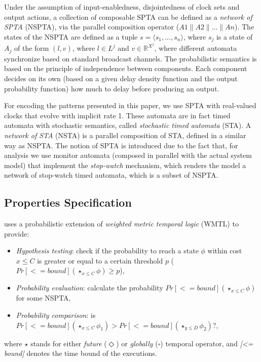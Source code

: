 Under the assumption of input-enabledness, disjointedness of clock sets and output actions, a collection of composable SPTA can be defined as a  \textit{network of SPTA} (NSPTA), via the parallel composition operator ($A1\parallel A2 \parallel ... \parallel An$).
The states of the NSPTA are defined as a tuple $s = \langle s_1,...,s_n\rangle$, where $s_j$ is a state of $A_j$ of the form $(l, v)$, where $l \in L^j$ and $v \in \mathbb{R}^{X^j}$, where different automata synchronize based on standard broadcast channels. 
The probabilistic semantics is based on the principle of independence between components.
Each component decides on its own (based on a given delay density function and the output probability function) how much to delay before producing an output.

For encoding the patterns presented in this paper, we use SPTA with real-valued clocks that evolve with implicit rate 1. These automata are in fact timed automata with stochastic semantics, called \textit{stochastic timed automata} (STA). A \textit{network of STA} (NSTA) is a parallel composition of STA, defined in a similar way as NSPTA. The notion of SPTA is introduced due to the fact that, for analysis we use monitor automata (composed in parallel with the actual system model) that implement the \emph{stop-watch} mechanism, which renders the model a network of stop-watch timed automata, which is a subset of NSPTA.

\subsection*{Properties Specification}
\uppaalsmc{} uses a probabilistic extension of \textit{weighted metric temporal logic} (WMTL) \cite{bulychev2012rewrite} to provide:
\begin{itemize}
	\item \textit{Hypothesis testing}: check if the probability to reach a state $\phi$ within cost $x\leq C$ is greater or equal to a certain threshold $p$ ($Pr[<= bound](\star_{x\leq C}\phi) \geq p$),
	\item \textit{Probability evaluation}: calculate the probability $Pr[<= bound](\star_{x\leq C}\phi)$ for some NSPTA,
	\item \textit{Probability comparison}: is $Pr[<= bound](\star_{x\leq C}\phi_1) > Pr[<= bound](\star_{y\leq D}\phi_2)$?,
\end{itemize}
where $\star$ stands for either \textit{future} ($\Diamond$) or \textit{globally} ($\square$) temporal operator, and \textit{[<= bound]} denotes the time bound of the executions.
